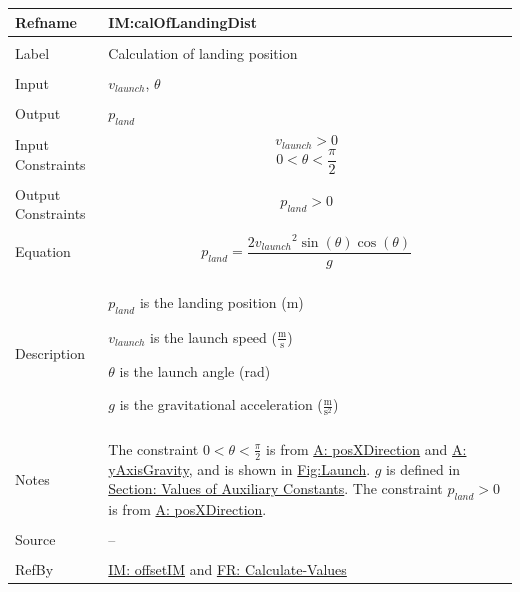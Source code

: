 \documentclass[12pt]{article}
\begin{document}
\noindent \begin{minipage}{\textwidth}
\begin{tabular}{p{} p{}}
\toprule \textbf{Refname} & \textbf{IM:calOfLandingDist}
\label{IM:calOfLandingDist}
\\ \midrule \\
Label & Calculation of landing position
\\ \midrule \\
Input & ${v_{launch}}$, $θ$
\\ \midrule \\
Output & ${p_{land}}$
\\ \midrule \\
Input Constraints & \begin{displaymath}
                    {v_{launch}}>0
                    \end{displaymath}
                    \begin{displaymath}
                    0<θ<\frac{π}{2}
                    \end{displaymath}
\\ \midrule \\
Output Constraints & \begin{displaymath}
                     {p_{land}}>0
                     \end{displaymath}
\\ \midrule \\
Equation & \begin{displaymath}
           {p_{land}}=\frac{2 {v_{launch}}^{2} \sin\left(θ\right) \cos\left(θ\right)}{g}
           \end{displaymath}
\\ \midrule \\
Description & \begin{symbDescription}
              \item{${p_{land}}$ is the landing position (m)}
              \item{${v_{launch}}$ is the launch speed ($\frac{\text{m}}{\text{s}}$)}
              \item{$θ$ is the launch angle (rad)}
              \item{$g$ is the gravitational acceleration ($\frac{\text{m}}{\text{s}^{2}}$)}
              \end{symbDescription}
\\ \midrule \\
Notes & The constraint $0<θ<\frac{π}{2}$ is from \hyperref[posXDirection]{A: posXDirection} and \hyperref[yAxisGravity]{A: yAxisGravity}, and is shown in \hyperref[Figure:Launch]{Fig:Launch}.
        $g$ is defined in \hyperref[Sec:AuxConstants]{Section: Values of Auxiliary Constants}.
        The constraint ${p_{land}}>0$ is from \hyperref[posXDirection]{A: posXDirection}.
\\ \midrule \\
Source & --
\\ \midrule \\
RefBy & \hyperref[IM:offsetIM]{IM: offsetIM} and \hyperref[calcValues]{FR: Calculate-Values}
\\ \bottomrule \end{tabular}
\end{minipage}
\end{document}
